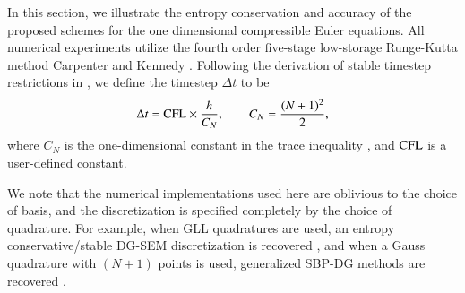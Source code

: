\documentclass[preprint,10pt]{elsarticle}
\theoremstyle{definition}
\theoremstyle{lemma}
\theoremstyle{theorem}
\theoremstyle{assumption}
\begin{document}
In this section, we illustrate the entropy conservation and accuracy of the proposed schemes for the one dimensional compressible Euler equations.  
All numerical experiments utilize the fourth order five-stage low-storage Runge-Kutta method Carpenter and Kennedy \cite{carpenter1994fourth}.  Following the derivation of stable timestep restrictions in \cite{chan2015gpu}, we define the timestep $\Delta t$ to be 
\[
\Delta t = {\rm CFL} \times \frac{h}{C_N}, \qquad C_N = \frac{(N+1)^2}{2},
\] 
where $C_N$ is the one-dimensional constant in the trace inequality \cite{warburton2003constants}, and ${\rm CFL}$ is a user-defined constant.  

We note that the numerical implementations used here are oblivious to the choice of basis, and the discretization is specified completely by the choice of quadrature.  For example, when GLL quadratures are used, an entropy conservative/stable DG-SEM discretization is recovered \cite{carpenter2014entropy, chen2017entropy, gassner2017br1}, and when a Gauss quadrature with $(N+1)$ points is used, generalized SBP-DG methods are recovered \cite{ranocha2017extended, ranocha2017comparison}.  

\end{document}
